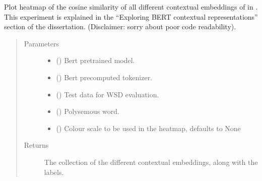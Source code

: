 \documentclass[letterpaper,10pt,english]{sphinxmanual}
\begin{document}

\begin{fulllineitems}
\label{\detokenize{code:code_utils.plotter.plot_heatmap_embeddings}}
Plot heatmap of the cosine similarity of all different contextual embeddings
of  in . This experiment is explained in  the “Exploring
BERT contextual representations” section of the dissertation. (Disclaimer:
sorry about poor code readability).
\begin{quote}\begin{description}
\item[{Parameters}] \leavevmode\begin{itemize}
\item {} 
 () \textendash{} Bert pretrained model.

\item {} 
 () \textendash{} Bert precomputed tokenizer.

\item {} 
 () \textendash{} Test data for WSD evaluation.

\item {} 
 () \textendash{} Polysemous word.

\item {} 
 (\sphinxstyleliteralemphasis{\sphinxupquote{, }}) \textendash{} Colour scale to be used in the heatmap,
defaults to None

\end{itemize}

\item[{Returns}] \leavevmode
The collection of the different contextual embeddings, along
with the labels.

\end{description}\end{quote}

\end{fulllineitems}
\end{document}
